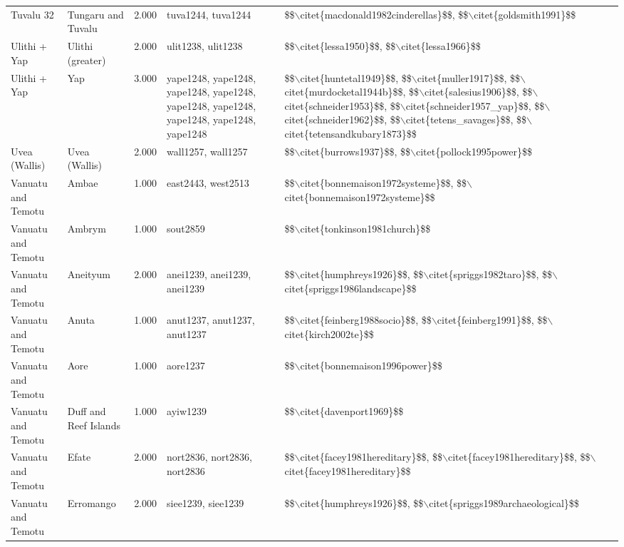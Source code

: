 \begin{longtable}{p{1.8cm}p{1.8cm}p{1.8cm}p{2cm}p{7cm}}
  Tuvalu 32 & Tungaru and Tuvalu & 2.000 & tuva1244, tuva1244 & \$\$$\backslash$citet\{macdonald1982cinderellas\}\$\$, \$\$$\backslash$citet\{goldsmith1991\}\$\$ \\ 
  Ulithi + Yap & Ulithi (greater) & 2.000 & ulit1238, ulit1238 & \$\$$\backslash$citet\{lessa1950\}\$\$, \$\$$\backslash$citet\{lessa1966\}\$\$ \\ 
  Ulithi + Yap & Yap & 3.000 & yape1248, yape1248, yape1248, yape1248, yape1248, yape1248, yape1248, yape1248, yape1248 & \$\$$\backslash$citet\{huntetal1949\}\$\$, \$\$$\backslash$citet\{muller1917\}\$\$, \$\$$\backslash$citet\{murdocketal1944b\}\$\$, \$\$$\backslash$citet\{salesius1906\}\$\$, \$\$$\backslash$citet\{schneider1953\}\$\$, \$\$$\backslash$citet\{schneider1957\_yap\}\$\$, \$\$$\backslash$citet\{schneider1962\}\$\$, \$\$$\backslash$citet\{tetens\_savages\}\$\$, \$\$$\backslash$citet\{tetensandkubary1873\}\$\$ \\ 
  Uvea (Wallis) & Uvea (Wallis) & 2.000 & wall1257, wall1257 & \$\$$\backslash$citet\{burrows1937\}\$\$, \$\$$\backslash$citet\{pollock1995power\}\$\$ \\ 
  Vanuatu and Temotu & Ambae & 1.000 & east2443, west2513 & \$\$$\backslash$citet\{bonnemaison1972systeme\}\$\$, \$\$$\backslash$citet\{bonnemaison1972systeme\}\$\$ \\ 
  Vanuatu and Temotu & Ambrym & 1.000 & sout2859 & \$\$$\backslash$citet\{tonkinson1981church\}\$\$ \\ 
  Vanuatu and Temotu & Aneityum & 2.000 & anei1239, anei1239, anei1239 & \$\$$\backslash$citet\{humphreys1926\}\$\$, \$\$$\backslash$citet\{spriggs1982taro\}\$\$, \$\$$\backslash$citet\{spriggs1986landscape\}\$\$ \\ 
  Vanuatu and Temotu & Anuta & 1.000 & anut1237, anut1237, anut1237 & \$\$$\backslash$citet\{feinberg1988socio\}\$\$, \$\$$\backslash$citet\{feinberg1991\}\$\$, \$\$$\backslash$citet\{kirch2002te\}\$\$ \\ 
  Vanuatu and Temotu & Aore & 1.000 & aore1237 & \$\$$\backslash$citet\{bonnemaison1996power\}\$\$ \\ 
  Vanuatu and Temotu & Duff and Reef Islands & 1.000 & ayiw1239 & \$\$$\backslash$citet\{davenport1969\}\$\$ \\ 
  Vanuatu and Temotu & Efate & 2.000 & nort2836, nort2836, nort2836 & \$\$$\backslash$citet\{facey1981hereditary\}\$\$, \$\$$\backslash$citet\{facey1981hereditary\}\$\$, \$\$$\backslash$citet\{facey1981hereditary\}\$\$ \\ 
  Vanuatu and Temotu & Erromango & 2.000 & siee1239, siee1239 & \$\$$\backslash$citet\{humphreys1926\}\$\$, \$\$$\backslash$citet\{spriggs1989archaeological\}\$\$ \\ 

\end{longtable}
